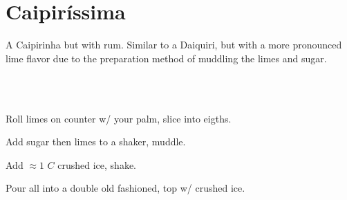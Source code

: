 \section[Caipir\'issima]{
    Caipir\'issima~
}

\begin{recipestats}[
        servings=1,
        preptime=5 \minute,
        source=Mike \& Jane,
        original=\citeauthor{diffordsCaipirissima}~\cite{diffordsCaipirissima},
    ]
\end{recipestats}

\begin{recipeabstract}
    A Caipirinha but with rum.
    Similar to a Daiquiri, but with a more pronounced lime flavor due to the
    preparation method of muddling the limes and sugar.
\end{recipeabstract}

\begin{ingredientcolumns}[1]
    \begin{ingredientblock}
        \\
        \\
    \end{ingredientblock}
\end{ingredientcolumns}

\begin{preparation}
\item Roll limes on counter w/ your palm, slice into eigths.
\item Add sugar then limes to a shaker, muddle.
\item Add $\approx 1$ $C$ crushed ice, shake.
\item Pour all into a double old fashioned, top w/ crushed ice.
\end{preparation}

\recipeend%
